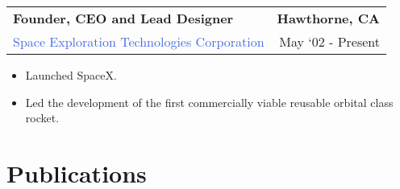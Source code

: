 \documentclass[10pt]{article}
\newcommand{\highlightcolor}{RoyalBlue}
\newcommand{\tabularxwidth}{\textwidth}
\begin{document}
    \begin{minipage}{\tabularxwidth}

        \begin{tabularx}{\tabularxwidth}{X r}
            \textbf{Founder, CEO and Lead Designer} & \textbf{Hawthorne, 
        CA} \\
            
    
    
    

    
        \textcolor{\highlightcolor}{Space Exploration Technologies Corporation} & 
        
    May ‘02 - Present \\
        
    
            
        \end{tabularx}

        \begin{itemize}[noitemsep, topsep=3pt, parsep=0pt, partopsep=0pt]
            
                \item 
    Launched SpaceX.
            
                \item 
    Led the development of the first commercially viable reusable orbital class rocket.
            
        \end{itemize}

        

    \end{minipage}
    


    
        \section{Publications}
\end{document}
